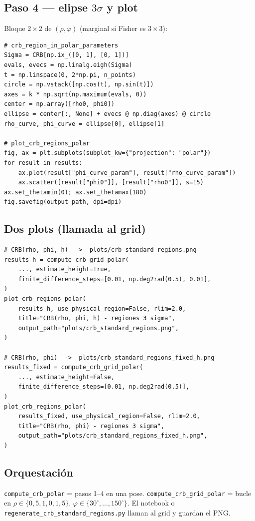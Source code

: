 \documentclass[11pt,a4paper]{article}
\theoremstyle{definition}
\begin{document}
\subsection{Paso 4 --- elipse $3\sigma$ y plot}
Bloque $2\times 2$ de $(\rho,\varphi)$ (marginal si Fisher es $3\times 3$):
\begin{lstlisting}
# crb_region_in_polar_parameters
Sigma = CRB[np.ix_([0, 1], [0, 1])]
evals, evecs = np.linalg.eigh(Sigma)
t = np.linspace(0, 2*np.pi, n_points)
circle = np.vstack([np.cos(t), np.sin(t)])
axes = k * np.sqrt(np.maximum(evals, 0))
center = np.array([rho0, phi0])
ellipse = center[:, None] + evecs @ np.diag(axes) @ circle
rho_curve, phi_curve = ellipse[0], ellipse[1]

# plot_crb_regions_polar
fig, ax = plt.subplots(subplot_kw={"projection": "polar"})
for result in results:
    ax.plot(result["phi_curve_param"], result["rho_curve_param"])
    ax.scatter([result["phi0"]], [result["rho0"]], s=15)
ax.set_thetamin(0); ax.set_thetamax(180)
fig.savefig(output_path, dpi=dpi)
\end{lstlisting}

\subsection{Dos plots (llamada al grid)}
\begin{lstlisting}
# CRB(rho, phi, h)  ->  plots/crb_standard_regions.png
results_h = compute_crb_grid_polar(
    ..., estimate_height=True,
    finite_difference_steps=[0.01, np.deg2rad(0.5), 0.01],
)
plot_crb_regions_polar(
    results_h, use_physical_region=False, rlim=2.0,
    title="CRB(rho, phi, h) - regiones 3 sigma",
    output_path="plots/crb_standard_regions.png",
)

# CRB(rho, phi)  ->  plots/crb_standard_regions_fixed_h.png
results_fixed = compute_crb_grid_polar(
    ..., estimate_height=False,
    finite_difference_steps=[0.01, np.deg2rad(0.5)],
)
plot_crb_regions_polar(
    results_fixed, use_physical_region=False, rlim=2.0,
    title="CRB(rho, phi) - regiones 3 sigma",
    output_path="plots/crb_standard_regions_fixed_h.png",
)
\end{lstlisting}

\subsection{Orquestaci\'on}
\texttt{compute\_crb\_polar} = pasos 1--4 en una pose.
\texttt{compute\_crb\_grid\_polar} = bucle en
$\rho\in\{0{,}5,1{,}0,1{,}5\}$,
$\varphi\in\{30^\circ,\ldots,150^\circ\}$.
El notebook o
\texttt{regenerate\_crb\_standard\_regions.py}
llaman al grid y guardan el PNG.
\end{document}
